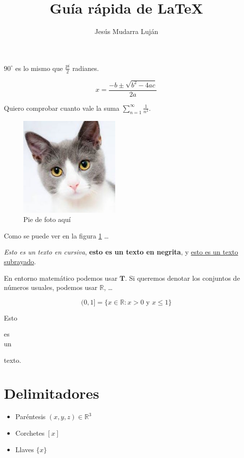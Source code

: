 \documentclass{article}
\title{Guía rápida de \LaTeX}
\author{Jesús Mudarra Luján}
\begin{document}
\maketitle

$90^{\circ}$ es lo mismo que $\frac{pi}{2}$ radianes.

\[x=\frac{-b\pm\sqrt{b^2-4ac}}{2a}\]

Quiero comprobar cuanto vale la suma $\displaystyle\sum_{n=1}^\infty \frac{1}{n^2}$.


\begin{figure}[h!]
    \centering
    \includegraphics[width=5cm]{cat.jpeg}
    \caption{Pie de foto aquí}
    \label{fig:my_label}
\end{figure}

Como se puede ver en la figura \ref{fig:my_label} \ldots

\textit{Esto es un texto en cursiva}, \textbf{esto es un texto en negrita}, y \underline{esto es un texto subrayado}.



\newpage

\noindent En entorno matemático podemos usar $\mathbf{T}$. Si queremos denotar los conjuntos de números usuales, podemos usar $\mathbb{R}$, \ldots

\[(0,1] = \{x \in  \mathbb{R}: x>0 \text{ y } x \le 1 \}\] %

Esto

es\\ %

un

texto.


\section{Delimitadores}

\begin{itemize}
    \item Paréntesis $(x,y,z) \in \mathbb R^3$
    \item Corchetes $[x]$
    \item Llaves $\{x\}$
\end{itemize}
\end{document}
